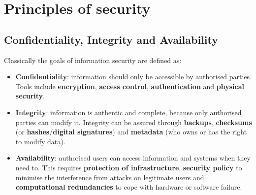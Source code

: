 \documentclass{article}
\begin{document}
\tableofcontents
\pagebreak

\section{Principles of security}

\subsection{Confidentiality, Integrity and Availability}
Classically the goals of information security are defined as:
\begin{itemize}
	\item \textbf{Confidentiality}: information should only be accessible by authorised parties. Tools include \textbf{encryption}, \textbf{access control}, \textbf{authentication} and \textbf{physical security}.
	\item \textbf{Integrity}: information is authentic and complete, because only authorised parties can modify it. Integrity can be assured through \textbf{backups}, \textbf{checksums} (or \textbf{hashes}/\textbf{digital signatures}) and \textbf{metadata} (who owns or has the right to modify data).
	\item \textbf{Availability}: authorised users can access information and systems when they need to. This requires \textbf{protection of infrastructure}, \textbf{security policy} to minimise the interference from attacks on legitimate users and \textbf{computational redundancies} to cope with hardware or software failure.
\end{itemize}
\end{document}
